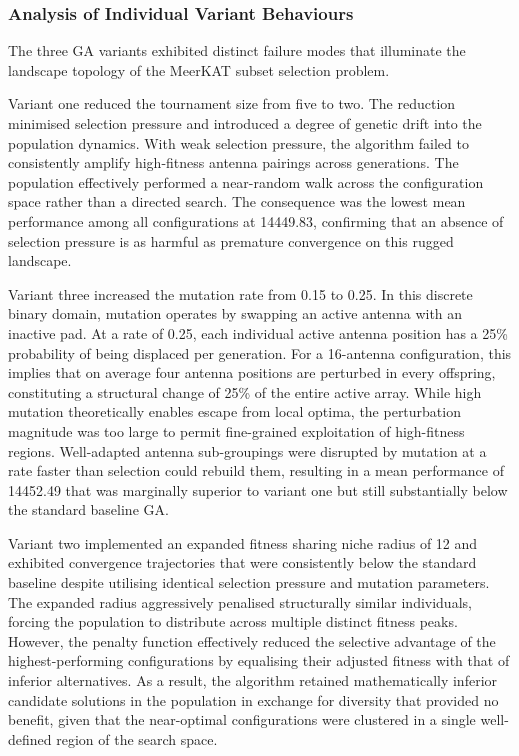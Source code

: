 \documentclass[conference]{IEEEtran}
\begin{document}
\subsubsection{Analysis of Individual Variant Behaviours}
The three GA variants exhibited distinct failure modes that illuminate the landscape topology
of the MeerKAT subset selection problem.
 
Variant one reduced the tournament size from five to two. The reduction minimised selection pressure
and introduced a degree of genetic drift into the population dynamics. With weak selection
pressure, the algorithm failed to consistently amplify high-fitness antenna pairings across
generations. The population effectively performed a near-random walk across the configuration
space rather than a directed search. The consequence was the lowest mean performance among all
configurations at 14449.83, confirming that an absence of selection pressure is as harmful as
premature convergence on this rugged landscape.
 
Variant three increased the mutation rate from 0.15 to 0.25. In this discrete binary domain,
mutation operates by swapping an active antenna with an inactive pad. At a rate of 0.25, each
individual active antenna position has a 25\% probability of being displaced per generation.
For a 16-antenna configuration, this implies that on average four antenna positions are
perturbed in every offspring, constituting a structural change of 25\% of the entire active
array. While high mutation theoretically enables escape from local optima, the perturbation
magnitude was too large to permit fine-grained exploitation of high-fitness regions. Well-adapted
antenna sub-groupings were disrupted by mutation at a rate faster than selection could rebuild
them, resulting in a mean performance of 14452.49 that was marginally superior to variant one
but still substantially below the standard baseline GA.
 
Variant two implemented an expanded fitness sharing niche radius of 12 and exhibited
convergence trajectories that were consistently below the standard baseline despite utilising
identical selection pressure and mutation parameters. The expanded radius aggressively penalised
structurally similar individuals, forcing the population to distribute across multiple distinct
fitness peaks. However, the penalty function effectively reduced the selective advantage of the
highest-performing configurations by equalising their adjusted fitness with that of inferior
alternatives. As a result, the algorithm retained mathematically inferior candidate solutions
in the population in exchange for diversity that provided no benefit, given that the
near-optimal configurations were clustered in a single well-defined region of the search space.
 
\end{document}
